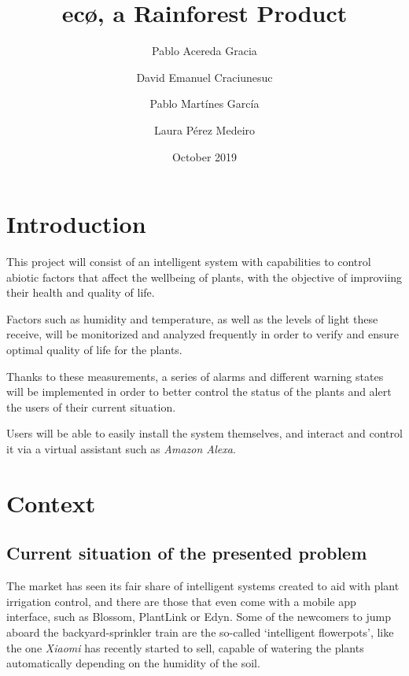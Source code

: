 \documentclass[english,runningheads,a4paper]{llncs}[2018/03/10]
\title{ec\textbf{\o}, a Rainforest Product}
\author{
    Pablo Acereda Gracia \and
    David Emanuel Craciunesuc \and
    Pablo Martínes García \and
    Laura Pérez Medeiro
}
\date{October 2019}
\begin{document}
\maketitle


\section*{Introduction}

This project will consist of an intelligent system with capabilities to control
abiotic factors that affect the wellbeing of plants, with the objective of
improviing their health and quality of life.

Factors such as humidity and temperature, as well as the levels of light these
receive, will be monitorized and analyzed frequently in order to verify and
ensure optimal quality of life for the plants.

Thanks to these measurements, a series of alarms and different warning states
will be implemented in order to better control the status of the plants and
alert the users of their current situation.

Users will be able to easily install the system themselves, and interact and
control it via a virtual assistant such as \textit{Amazon Alexa}.


\section*{Context}


    \subsection*{Current situation of the presented problem}

    The market has seen its fair share of intelligent systems created to aid
    with plant irrigation control, and there are those that even come with a
    mobile app interface, such as Blossom, PlantLink or Edyn. Some of the
    newcomers to jump aboard the backyard-sprinkler train are the so-called
    `intelligent flowerpots', like the one \textit{Xiaomi} has recently started
    to sell, capable of watering the plants automatically depending on the
    humidity of the soil.
\end{document}
